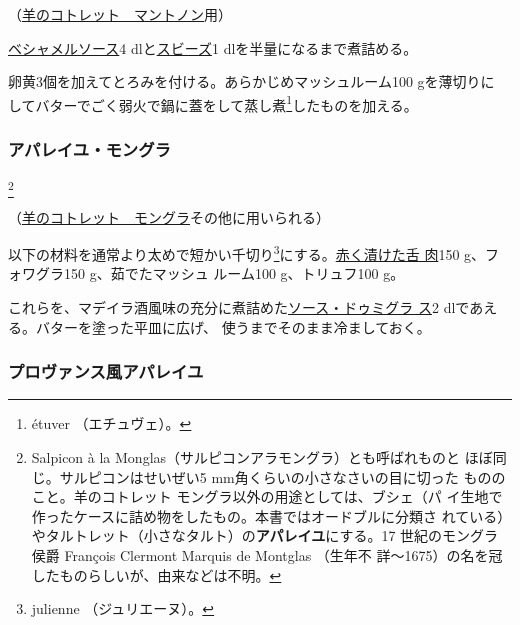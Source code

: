 \begin{recette}
（\protect\hyperlink{cotelettes-maintenon}{羊のコトレット　マントノン}用）

\protect\hyperlink{sauce-bechamel}{ベシャメルソース}4
dlと\protect\hyperlink{sauce-soubise}{スビーズ}1
dlを半量になるまで煮詰める。

卵黄3個を加えてとろみを付ける。あらかじめマッシュルーム100 gを薄切りに
してバターでごく弱火で鍋に蓋をして蒸し煮\footnote{étuver
  （エチュヴェ）。}したものを加える。

\hypertarget{appareil-montglas}{%
\subsubsection{アパレイユ・モングラ}\label{appareil-montglas}}

\footnote{Salpicon à la
  Monglas（サルピコンアラモングラ）とも呼ばれものと
  ほぼ同じ。サルピコンはせいぜい5 mm角くらいの小さなさいの目に切った
  もののこと。羊のコトレット モングラ以外の用途としては、ブシェ（パ
  イ生地で作ったケースに詰め物をしたもの。本書ではオードブルに分類さ
  れている）やタルトレット（小さなタルト）の\textbf{アパレイユ}にする。17
  世紀のモングラ侯爵 François Clermont Marquis de Montglas （生年不
  詳〜1675）の名を冠したものらしいが、由来などは不明。}


（\protect\hyperlink{cotelettes-mongras}{羊のコトレット　モングラ}その他に用いられる）

以下の材料を通常より太めで短かい千切り\footnote{julienne
  （ジュリエーヌ）。}にする。\protect\hyperlink{saumure-liquide-pour-langue}{赤く漬けた舌
肉}150 g、フォワグラ150 g、茹でたマッシュ ルーム100 g、トリュフ100 g。

これらを、マデイラ酒風味の充分に煮詰めた\protect\hyperlink{sauce-demi-glace}{ソース・ドゥミグラ
ス}2\undemi{} dlであえる。バターを塗った平皿に広げ、
使うまでそのまま冷ましておく。

\hypertarget{appareil-provencal}{%
\subsubsection{プロヴァンス風アパレイユ}\label{appareil-provencal}}


\end{recette}
